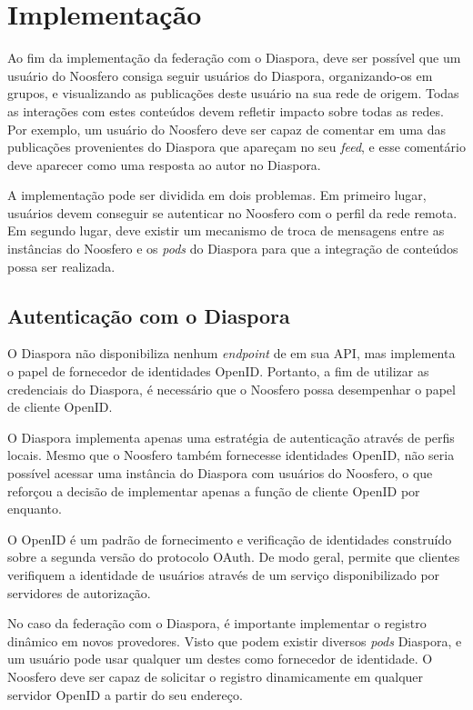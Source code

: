 \chapter{Implementação}

Ao fim da implementação da federação com o Diaspora, deve ser possível que um
usuário do Noosfero consiga seguir usuários do Diaspora, organizando-os em grupos, e
visualizando as publicações deste usuário na sua rede de origem. Todas as interações
com estes conteúdos devem refletir impacto sobre todas as redes. Por exemplo, um
usuário do Noosfero deve ser capaz de comentar em uma das publicações provenientes
do Diaspora que apareçam no seu \textit{feed}, e esse comentário deve aparecer como
uma resposta ao autor no Diaspora.


A implementação pode ser dividida em dois problemas. Em primeiro lugar, usuários
devem conseguir se autenticar no Noosfero com o perfil da rede remota. Em segundo
lugar, deve existir um mecanismo de troca de mensagens entre as instâncias do
Noosfero e os \textit{pods} do Diaspora para que a integração de conteúdos possa ser
realizada.


\section{Autenticação com o Diaspora}

O Diaspora não disponibiliza nenhum \textit{endpoint} de  em sua API,
mas implementa o papel de fornecedor de identidades OpenID. Portanto, a fim de
utilizar as credenciais do Diaspora, é necessário que o Noosfero possa desempenhar o
papel de cliente OpenID.

O Diaspora implementa apenas uma estratégia de autenticação através de perfis
locais. Mesmo que o Noosfero também fornecesse identidades OpenID, não seria
possível acessar uma instância do Diaspora com usuários do Noosfero, o que reforçou
a decisão de implementar apenas a função de cliente OpenID por enquanto.

O OpenID é um padrão de fornecimento e verificação de identidades construído sobre a
segunda versão do protocolo OAuth. De modo geral, permite que clientes verifiquem a
identidade de usuários através de um serviço disponibilizado por servidores de
autorização.


No caso da federação com o Diaspora, é importante implementar o registro dinâmico em
novos provedores. Visto que podem existir diversos \textit{pods} Diaspora, e um
usuário pode usar qualquer um destes como fornecedor de identidade. O Noosfero deve
ser capaz de solicitar o registro dinamicamente em qualquer servidor OpenID a partir
do seu endereço.

